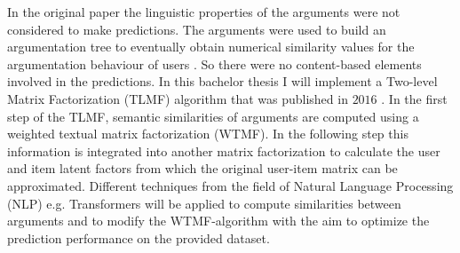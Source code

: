 \documentclass{article}
\begin{document}
In the original paper \cite{HowIArgue} the linguistic properties of the arguments were not considered to make predictions. 
The arguments were used to build an argumentation tree to eventually obtain numerical similarity
values for the argumentation behaviour of users \cite{brenneis2020much}. So there were no content-based elements involved
in the predictions. In this bachelor thesis I will implement a Two-level Matrix Factorization (TLMF) algorithm that was published in $2016$ \cite{li2016two}. 
In the first step of the TLMF, semantic similarities of arguments are computed using a weighted textual matrix factorization (WTMF). 
In the following step this information is integrated into another matrix factorization to calculate the
user and item latent factors from which the original user-item matrix can be approximated.
Different techniques from the field of Natural Language Processing (NLP) e.g. Transformers \cite{vaswani2017attention}
will be applied to compute similarities between arguments and to modify the WTMF-algorithm with the aim to optimize the prediction performance on the 
provided dataset.

\printbibliography
\end{document}
